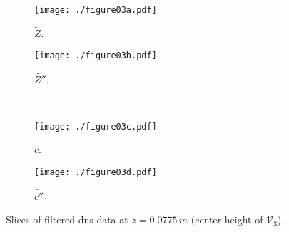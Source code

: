 \documentclass[review]{elsarticle}
\newcommand{\wt}[1]{\widetilde{#1}}
\begin{document}
\clearpage\newpage
\begin{figure}[!tbp]%
  \centering%
  \begin{subfigure}[t]{0.48\textwidth}%
    \texttt{[image: ./figure03a.pdf]}%
    \caption{$\wt{Z}$.}%
  \end{subfigure}\hfill%
  \begin{subfigure}[t]{0.48\textwidth}%
    \texttt{[image: ./figure03b.pdf]}%
    \caption{$\wt{Z''}$.}%
  \end{subfigure}\\%
  \begin{subfigure}[t]{0.48\textwidth}%
    \texttt{[image: ./figure03c.pdf]}%
    \caption{$\wt{c}$.}%
 \end{subfigure}\hfill%
  \begin{subfigure}[t]{0.48\textwidth}%
    \texttt{[image: ./figure03d.pdf]}%
    \caption{$\wt{c''}$.}%
  \end{subfigure}
  \caption{Slices of filtered \gls{dns} data at $z=0.0775\,\unit{m}$ (center height of $\mathcal{V}_3$).}\label{fig:slices}%
\end{figure}%
\end{document}
